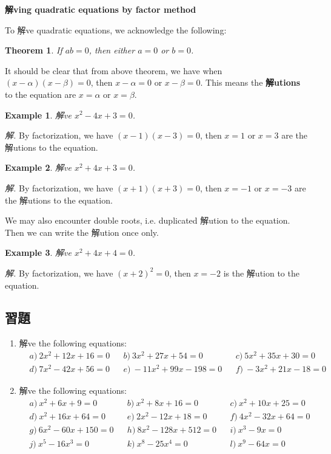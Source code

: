 \documentclass[12pt]{article}
\newtheorem*{theorem}{Theorem}
\newtheorem{example}{Example}
\begin{document}
    \begin{center}
        \textbf{解ving quadratic equations by factor method}
    \end{center}

    To 解ve quadratic equations, we acknowledge the following:\begin{theorem}
        If $ab=0$, then either $a=0$ or $b=0$.
    \end{theorem}

    It should be clear that from above theorem, we have when $(x-\alpha)(x-\beta)=0$, then $x-\alpha=0$ or $x-\beta=0$. This means the \textbf{解utions} to the equation are $x=\alpha$ or $x=\beta$.

    \begin{example}
        解ve $x^2-4x+3=0$.
    \end{example}

    \textit{ 解. }By factorization, we have $(x-1)(x-3)=0$, then $x=1$ or $x=3$ are the 解utions to the equation.

    \begin{example}
        解ve $x^2+4x+3=0$.
    \end{example}

    \textit{ 解. }By factorization, we have $(x+1)(x+3)=0$, then $x=-1$ or $x=-3$ are the 解utions to the equation.

    We may also encounter double roots, i.e. duplicated 解ution to the equation. Then we can write the 解ution once only.

    \begin{example}
        解ve $x^2+4x+4=0$.
    \end{example}

    \textit{ 解. }By factorization, we have $(x+2)^2=0$, then $x=-2$ is the 解ution to the equation.

    \subsection*{習題}
    \begin{enumerate}
        \item 解ve the following equations:\begin{align*}
            &a)\ 2x^2+12x+16=0&&b)\ 3x^2+27x+54=0&&c)\ 5x^2+35x+30=0\\
            &d)\ 7x^2-42x+56=0&&e)\ -11x^2+99x-198=0&&f)\ -3x^2+21x-18=0
        \end{align*}
        \item 解ve the following equations:\begin{align*}
            &a)\ x^2+6x+9=0&&b)\ x^2+8x+16=0&&c)\ x^2+10x+25=0\\
            &d)\ x^2+16x+64=0&&e)\ 2x^2-12x+18=0&&f)\ 4x^2-32x+64=0\\
            &g)\ 6x^2-60x+150=0&&h)\ 8x^2-128x+512=0&&i)\ x^3-9x=0\\
            &j)\ x^5-16x^3=0&&k)\ x^8-25x^4=0&&l)\ x^9-64x=0
        \end{align*}
    \end{enumerate}
\end{document}
